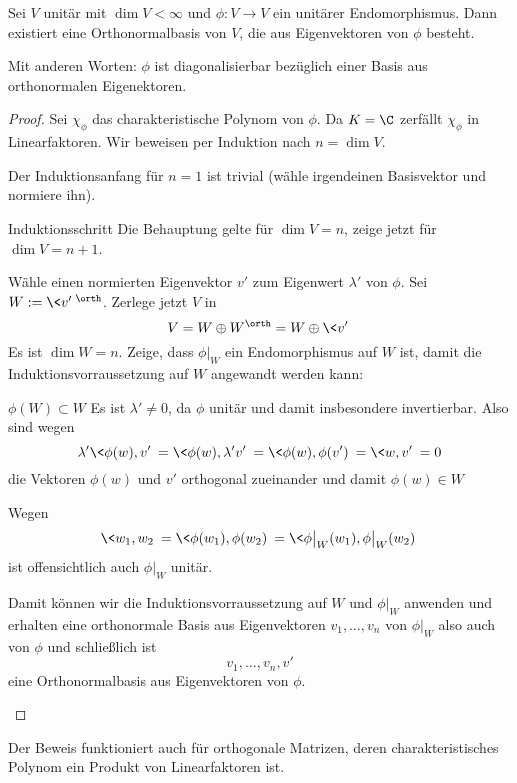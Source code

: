 \documentclass{mycourse}
\begin{document}
\begin{thm}
	\label{thm:13.20}
	Sei $V$ unitär mit $\dim V<\infty$ und $\phi:V\to V$ ein unitärer Endomorphismus.
	Dann existiert eine Orthonormalbasis von $V$, die aus Eigenvektoren von $\phi$ besteht.
	\begin{note}
		Mit anderen Worten: $\phi$ ist diagonalisierbar bezüglich einer Basis aus orthonormalen Eigenektoren.
	\end{note}
	\begin{proof}
		Sei $\chi_\phi$ das charakteristische Polynom von $\phi$.
		Da $K=\C$ zerfällt $\chi_\phi$ in Linearfaktoren.
		Wir beweisen per Induktion nach $n = \dim V$.

		Der Induktionsanfang für $n=1$ ist trivial (wähle irgendeinen Basisvektor und normiere ihn).
		
		\begin{seg}{Induktionsschritt}
			Die Behauptung gelte für $\dim V=n$, zeige jetzt für $\dim V=n+1$.

			Wähle einen normierten Eigenvektor $v'$ zum Eigenwert $\lambda'$ von $\phi$.
			Sei $W := \<v'\>^\orth$.
			Zerlege jetzt $V$ in
			\[
				V = W \oplus W^\orth = W \oplus \<v'\>
			\]
			Es ist $\dim W = n$.
			Zeige, dass $\phi\big|_W$ ein Endomorphismus auf $W$ ist, damit die Induktionsvorraussetzung auf $W$ angewandt werden kann:

			\begin{seg}{$\phi(W) \subset W$}
				Es ist $\lambda'\neq 0$, da $\phi$ unitär und damit insbesondere invertierbar.
				Also sind wegen
				\[
					\lambda' \<\phi(w),v'\> = \<\phi(w),\lambda'v'\> = \<\phi(w),\phi(v')\> = \<w,v'\> = 0
				\]
				die Vektoren $\phi(w)$ und $v'$ orthogonal zueinander und damit $\phi(w)\in W$				
			\end{seg}
			Wegen
			\[
				\<w_1,w_2\> = \<\phi(w_1),\phi(w_2)\> = \<\phi\big|_W(w_1),\phi\big|_W(w_2)\>
			\]
			ist offensichtlich auch $\phi|_W$ unitär.

			Damit können wir die Induktionsvorraussetzung auf $W$ und $\phi|_W$ anwenden und erhalten eine orthonormale Basis aus Eigenvektoren $v_1,\dotsc,v_n$ von $\phi|_W$ also auch von $\phi$ und schließlich ist
			\[
				v_1,\dotsc, v_n, v'
			\]
			eine Orthonormalbasis aus Eigenvektoren von $\phi$.
		\end{seg}
	\end{proof}
	\begin{note}
		Der Beweis funktioniert auch für orthogonale Matrizen, deren charakteristisches Polynom ein Produkt von Linearfaktoren ist.
	\end{note}
\end{thm}
\end{document}
